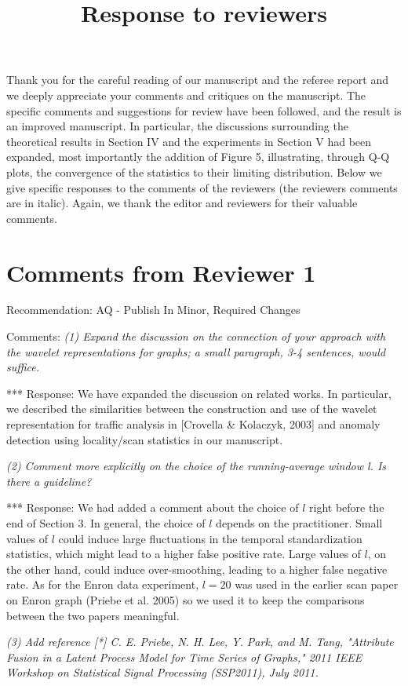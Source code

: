 \documentclass{article}
\begin{document}
\title{Response to reviewers}
\maketitle
\date{}
Thank you for the careful reading of our manuscript and the referee
report and we deeply appreciate your comments and critiques on the
manuscript. The specific comments and suggestions for review have been
followed, and the result is an improved manuscript. In particular,
the discussions surrounding the theoretical results in Section IV and
the experiments in Section V had been expanded, most importantly the
addition of Figure 5, illustrating, through Q-Q plots, 
the convergence of the statistics to their limiting distribution. Below we
give specific responses to the comments of the reviewers (the
reviewers comments are in italic). Again, we
thank the editor and reviewers for their valuable comments.

\section{Comments from Reviewer 1}
Recommendation: AQ - Publish In Minor, Required Changes

Comments:
{\em (1) Expand the discussion on the connection of your approach with the
wavelet representations for graphs; a small paragraph, 3-4 sentences,
would suffice.}

*** Response: We have expanded the discussion on related works. In
particular, we described the similarities between the construction and
use of the wavelet representation for traffic analysis in [Crovella \&
Kolaczyk, 2003] and anomaly detection using locality/scan statistics
in our manuscript.

{\em (2) Comment more explicitly on the choice of the running-average
window l. Is there a guideline?}

*** Response: We had added a comment about the choice of $l$ right
before the end of Section 3. In general, the choice of $l$ depends on
the practitioner. Small values of $l$ could induce large fluctuations
in the temporal standardization statistics, which might lead to a
higher false positive rate. Large values of $l$, on the other hand,
could induce over-smoothing, leading to a higher false negative
rate. As for the Enron data experiment, $l = 20$ was used in the
earlier scan paper on Enron graph (Priebe et al. 2005) so we used it
to keep the comparisons between the two papers meaningful.

{\em (3) Add reference [*] C. E. Priebe, N. H. Lee, Y. Park, and
M. Tang, "Attribute Fusion in a Latent Process Model for Time Series
of Graphs," 2011 IEEE Workshop on Statistical Signal Processing
(SSP2011), July 2011.}
\end{document}
